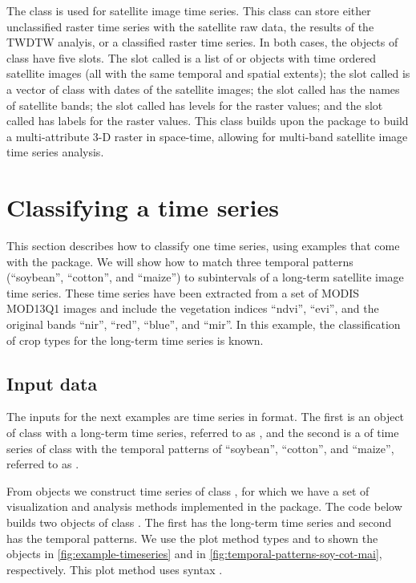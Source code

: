 \documentclass[article,shortnames]{jss}
\begin{document}
The class  is used for satellite image time series.
This class can store either unclassified raster time series with the
satellite raw data, the results of the TWDTW analyis, or a classified
raster time series. In both cases, the objects of class
 have five slots. The slot called  is
a list of  or  objects with time
ordered satellite images (all with the same temporal and spatial
extents); the slot called  is a vector of class
 with dates of the satellite images; the slot called
 has the names of satellite bands; the slot called
 has levels for the raster values; and the slot called
 has labels for the raster values. This class builds upon
the  package  to build a multi-attribute 3-D
raster in space-time, allowing for multi-band satellite image time
series analysis.

\hypertarget{classifying-a-time-series}{%
\section{Classifying a time series}\label{classifying-a-time-series}}

This section describes how to classify one time series, using examples
that come with the  package. We will show how to match three
temporal patterns (``soybean'', ``cotton'', and ``maize'') to
subintervals of a long-term satellite image time series. These time
series have been extracted from a set of MODIS MOD13Q1
\citep{Didan:2015} images and include the vegetation indices ``ndvi'',
``evi'', and the original bands ``nir'', ``red'', ``blue'', and ``mir''.
In this example, the classification of crop types for the long-term time
series is known.

\hypertarget{input-data}{%
\subsection{Input data}\label{input-data}}

The inputs for the next examples are time series in  format.
The first is an object of class  with a long-term time series,
referred to as , and the second is a  of
time series of class  with the temporal patterns of
``soybean'', ``cotton'', and ``maize'', referred to as
.

From  objects we construct time series of class
, for which we have a set of visualization and
analysis methods implemented in the  package. The code below
builds two objects of class . The first has the
long-term time series and second has the temporal patterns. We use the
plot method types  and  to shown the
objects  in \autoref{fig:example-timeseries} and
 in \autoref{fig:temporal-patterns-soy-cot-mai},
respectively. This plot method uses  syntax
\citep{Wickham:2009}.
\end{document}

